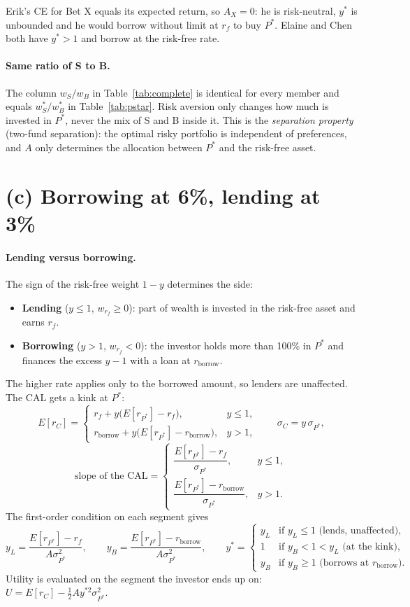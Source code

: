 \documentclass[11pt]{article}
\newcommand{\rb}{r_{\text{borrow}}}
\newcommand{\Er}[1]{E[r_{#1}]}
\begin{document}
\noindent Erik's CE for Bet X equals its expected return, so $A_X = 0$: he is risk-neutral, $y^*$ is unbounded and he would borrow without limit at $r_f$ to buy $P^*$. Elaine and Chen both have $y^* > 1$ and borrow at the risk-free rate.

\paragraph{Same ratio of S to B.}
The column $w_S/w_B$ in Table~\ref{tab:complete} is identical for every member and equals $w_S^*/w_B^*$ in Table~\ref{tab:pstar}. Risk aversion only changes how much is invested in $P^*$, never the mix of S and B inside it. This is the \emph{separation property} (two-fund separation): the optimal risky portfolio is independent of preferences, and $A$ only determines the allocation between $P^*$ and the risk-free asset.

\section*{(c) Borrowing at 6\%, lending at 3\%}

\paragraph{Lending versus borrowing.}
The sign of the risk-free weight $1-y$ determines the side:
\begin{itemize}
  \item \textbf{Lending} ($y \le 1$, $w_{r_f} \ge 0$): part of wealth is invested in the risk-free asset and earns $r_f$.
  \item \textbf{Borrowing} ($y > 1$, $w_{r_f} < 0$): the investor holds more than 100\% in $P^*$ and finances the excess $y-1$ with a loan at $\rb$.
\end{itemize}
The higher rate applies only to the borrowed amount, so lenders are unaffected. The CAL gets a kink at $P^*$:
\[
\Er{C} =
\begin{cases}
r_f + y\bigl(\Er{P^*} - r_f\bigr), & y \le 1, \\[2pt]
\rb + y\bigl(\Er{P^*} - \rb\bigr), & y > 1,
\end{cases}
\qquad \sigma_C = y\,\sigma_{P^*},
\]
\[
\text{slope of the CAL} =
\begin{cases}
\dfrac{\Er{P^*} - r_f}{\sigma_{P^*}}, & y \le 1, \\[8pt]
\dfrac{\Er{P^*} - \rb}{\sigma_{P^*}}, & y > 1.
\end{cases}
\]
The first-order condition on each segment gives
\[
y_L = \frac{\Er{P^*} - r_f}{A\sigma_{P^*}^2}, \qquad
y_B = \frac{\Er{P^*} - \rb}{A\sigma_{P^*}^2},
\qquad
y^* =
\begin{cases}
y_L & \text{if } y_L \le 1 \text{ (lends, unaffected)}, \\
1   & \text{if } y_B < 1 < y_L \text{ (at the kink)}, \\
y_B & \text{if } y_B \ge 1 \text{ (borrows at } \rb\text{)}.
\end{cases}
\]
Utility is evaluated on the segment the investor ends up on: $U = \Er{C} - \tfrac12 A y^{*2}\sigma_{P^*}^2$.
\end{document}
